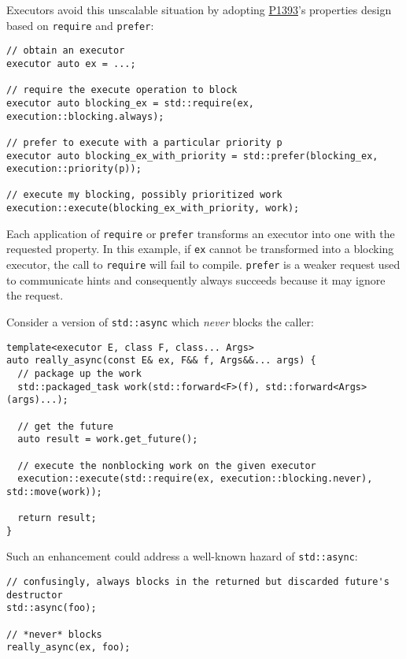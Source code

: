 \documentclass[a4paper,12pt,notitlepage,twoside,openright]{article}
\begin{document}
Executors avoid this unscalable situation by adopting
\href{https://wg21.link/P1393}{P1393}'s properties design based on
\texttt{require} and \texttt{prefer}:

\begin{verbatim}
// obtain an executor
executor auto ex = ...;

// require the execute operation to block
executor auto blocking_ex = std::require(ex, execution::blocking.always);

// prefer to execute with a particular priority p
executor auto blocking_ex_with_priority = std::prefer(blocking_ex, execution::priority(p));

// execute my blocking, possibly prioritized work
execution::execute(blocking_ex_with_priority, work);
\end{verbatim}

Each application of \texttt{require} or
\texttt{prefer} transforms an executor into one with the
requested property. In this example, if \texttt{ex} cannot
be transformed into a blocking executor, the call to
\texttt{require} will fail to compile.
\texttt{prefer} is a weaker request used to communicate
hints and consequently always succeeds because it may ignore the
request.

Consider a version of \texttt{std::async} which \emph{never}
blocks the caller:

\begin{verbatim}
template<executor E, class F, class... Args>
auto really_async(const E& ex, F&& f, Args&&... args) {
  // package up the work
  std::packaged_task work(std::forward<F>(f), std::forward<Args>(args)...);

  // get the future
  auto result = work.get_future();

  // execute the nonblocking work on the given executor
  execution::execute(std::require(ex, execution::blocking.never), std::move(work));

  return result;
}
\end{verbatim}

Such an enhancement could address a well-known hazard of
\texttt{std::async}:

\begin{verbatim}
// confusingly, always blocks in the returned but discarded future's destructor
std::async(foo);

// *never* blocks
really_async(ex, foo);
\end{verbatim}
\end{document}
